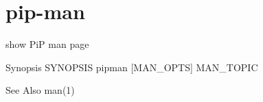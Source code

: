 \hypertarget{group__pip-man}{\section{pip-\/man}
\label{group__pip-man}
}


show Pi\-P man page  


\begin{DoxyParagraph}{Synopsis}
S\-Y\-N\-O\-P\-S\-I\-S pipman \mbox{[}M\-A\-N\-\_\-\-O\-P\-T\-S\mbox{]} M\-A\-N\-\_\-\-T\-O\-P\-I\-C
\end{DoxyParagraph}
\begin{DoxySeeAlso}{See Also}
man(1) 
\end{DoxySeeAlso}
